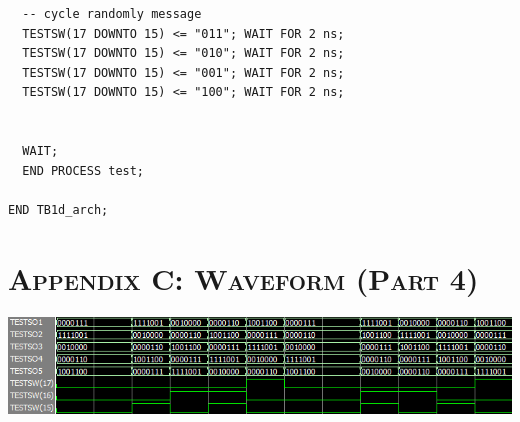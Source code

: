 \documentclass[11pt]{report}
\begin{document}
\begin{spacing}{1.5}
\begin{lstlisting}
  -- cycle randomly message
  TESTSW(17 DOWNTO 15) <= "011"; WAIT FOR 2 ns;
  TESTSW(17 DOWNTO 15) <= "010"; WAIT FOR 2 ns;
  TESTSW(17 DOWNTO 15) <= "001"; WAIT FOR 2 ns;
  TESTSW(17 DOWNTO 15) <= "100"; WAIT FOR 2 ns;


  WAIT;                                                        
  END PROCESS test;
                                          
END TB1d_arch;
\end{lstlisting}

\chapter*{\scshape Appendix C: Waveform (Part 4)}
\label{app:c}

\vspace{45px}
\centering
\includegraphics[width=1\textwidth]{timing_5_ssd}


\end{spacing}
\end{document}
